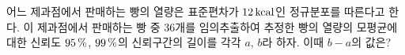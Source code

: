 어느 제과점에서 판매하는 빵의 열량은 표준편차가 $12\mkern3mu \mathrm{kcal}$인 정규분포를 따른다고 한다. 이 제과점에서 판매하는 빵 중 36개를 임의추출하여 추정한 빵의 열량의 모평균에 대한 신뢰도 $95\mkern3mu \%$, $99\mkern3mu \%$의 신뢰구간의 길이를 각각 $a$, $b$라 하자. 이때 $b-a$의 값은? 
